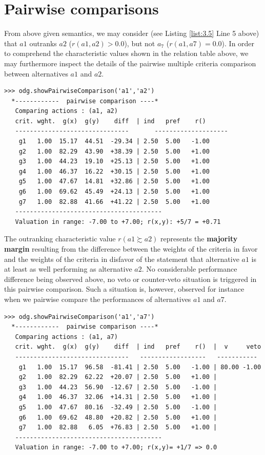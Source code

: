 \section{Pairwise comparisons}
\label{sec:3.3}

From above given semantics, we may consider (see Listing \ref{list:3.5} Line 5 above) that $a1$ outranks $a2$ ($r(a1,a2) > 0.0$), but not $a_7$ ($r(a1,a7) = 0.0$). In order to comprehend the characteristic values shown in the relation table above, we may furthermore inspect the details of the pairwise multiple criteria comparison between alternatives $a1$ and $a2$.

\begin{lstlisting}[caption={Inspecting a pairwise multiple criteria comparison},label=list:3.6]
>>> odg.showPairwiseComparison('a1','a2')
  *------------  pairwise comparison ----*
   Comparing actions : (a1, a2)
   crit. wght.  g(x)  g(y)    diff  | ind   pref    r() 
   -------------------------------  	 --------------------
    g1   1.00  15.17  44.51  -29.34 | 2.50  5.00   -1.00 
    g2   1.00  82.29  43.90  +38.39 | 2.50  5.00   +1.00 
    g3   1.00  44.23  19.10  +25.13 | 2.50  5.00   +1.00 
    g4   1.00  46.37  16.22  +30.15 | 2.50  5.00   +1.00 
    g5   1.00  47.67  14.81  +32.86 | 2.50  5.00   +1.00 
    g6   1.00  69.62  45.49  +24.13 | 2.50  5.00   +1.00 
    g7   1.00  82.88  41.66  +41.22 | 2.50  5.00   +1.00 
   ----------------------------------------
   Valuation in range: -7.00 to +7.00; r(x,y): +5/7 = +0.71
\end{lstlisting}

The outranking characteristic value $r(a1 \succsim a2)$ represents the {\bf majority margin} resulting from the difference between the weights of the criteria in favor and the weights of the criteria in disfavor of the statement that alternative $a1$ is at least as well performing as alternative $a2$. No considerable performance difference being observed above, no veto or counter-veto situation is triggered in this pairwise comparison. Such a situation is, however, observed for instance when we pairwise compare the performances of alternatives $a1$ and $a7$.

\begin{lstlisting}
>>> odg.showPairwiseComparison('a1','a7')
  *------------  pairwise comparison ----*
   Comparing actions : (a1, a7)
   crit. wght.  g(x)  g(y)    diff  | ind   pref    r()  |  v     veto
   -------------------------------   ------------------   -----------
    g1   1.00  15.17  96.58  -81.41 | 2.50  5.00   -1.00 | 80.00 -1.00
    g2   1.00  82.29  62.22  +20.07 | 2.50  5.00   +1.00 | 
    g3   1.00  44.23  56.90  -12.67 | 2.50  5.00   -1.00 | 
    g4   1.00  46.37  32.06  +14.31 | 2.50  5.00   +1.00 | 
    g5   1.00  47.67  80.16  -32.49 | 2.50  5.00   -1.00 | 
    g6   1.00  69.62  48.80  +20.82 | 2.50  5.00   +1.00 | 
    g7   1.00  82.88   6.05  +76.83 | 2.50  5.00   +1.00 | 
   ----------------------------------------
   Valuation in range: -7.00 to +7.00; r(x,y)= +1/7 => 0.0
\end{lstlisting}

